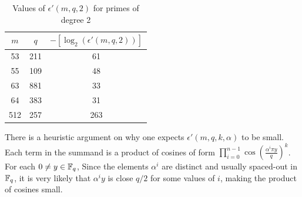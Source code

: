 \documentclass{amsart}
\begin{document}
\FloatBarrier
\begin{table}[H] \label{tab: deg2}
\caption{Values of $\epsilon'(m,q,2)$ for primes of degree 2}
\begin{tabular}{c|c|c}
$m$ & $q$ & $-[\log_2(\epsilon'(m,q,2))]$ \\
\hline
53 & 211 & 61 \\
55 & 109 & 48 \\
63 & 881 & 33 \\
64 & 383 & 31 \\
512 & 257 & 263
\end{tabular}
\end{table}

\begin{remark}
There is a heuristic argument on why one expects $\epsilon'(m,q,k,\alpha)$ to be small. Each term in the summand is a product of cosines of form $\prod_{i=0}^{n-1} \cos \left(\frac{ \alpha^i \pi y}{q} \right)^k$. For each $0 \neq y \in \mathbb{F}_q$, Since the elements $\alpha^i$ are distinct and usually spaced-out in $\mathbb{F}_q$, it is very likely that $\alpha^i y$ is close $q/2$ for some values of $i$, making the product of cosines small.
\end{remark}



\end{document}
